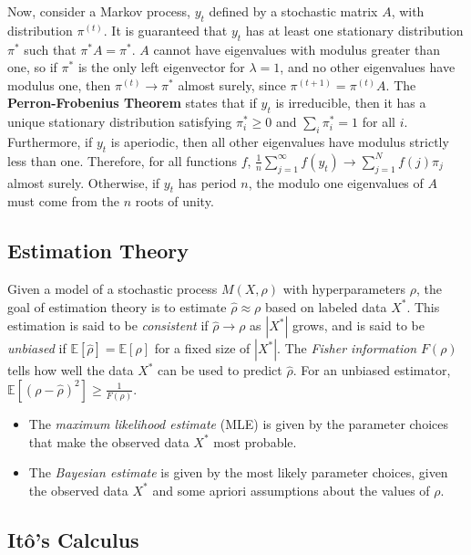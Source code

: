 \documentclass[12pt]{article}
\begin{document}
Now, consider a Markov process, $y_t$ defined by a stochastic matrix $A$,
with distribution $\pi^{(t)}$.
It is guaranteed that $y_t$ has at least one stationary distribution $\pi^*$
such that $\pi^* A = \pi^*$.
$A$ cannot have eigenvalues with modulus greater than one, so if $\pi^*$ is
the only left eigenvector for $\lambda=1$, and no other eigenvalues have modulus
one, then $\pi^{(t)}\rightarrow \pi^*$ almost surely, since
$\pi^{(t+1)} = \pi^{(t)}A$.
The {\bf Perron-Frobenius Theorem} states that if $y_t$ is irreducible,
then it has a unique stationary distribution satisfying $\pi^*_i \geq 0$
and $\sum_i \pi^*_i = 1$ for all $i$. 
Furthermore, if $y_t$ is aperiodic, then all other eigenvalues have
modulus strictly less than one.
Therefore, for all functions $f$,
$\frac{1}{n}\sum_{j=1}^\infty f(y_t) \rightarrow \sum_{j=1}^N f(j) \pi_j$
almost surely.
Otherwise, if $y_t$ has period $n$, the modulo one eigenvalues of $A$
must come from the $n$ roots of unity.

\subsection*{Estimation Theory}

Given a model of a stochastic process $M(X,\rho)$ with hyperparameters
$\rho$, the goal of estimation theory is to estimate 
${\hat \rho} \approx \rho$ based on labeled data $X^*$.
This estimation is said to be {\it consistent} if 
${\hat \rho} \rightarrow \rho$ as $|X^*|$ grows, and is said to be
{\it unbiased} if $\mathbb{E}[{\hat \rho}] = \mathbb{E}[\rho]$ for a
fixed size of $|X^*|$.
The {\it Fisher information} $F(\rho)$ tells how well the data $X^*$ can be
used to predict ${\hat \rho}$.
For an unbiased estimator,
$\mathbb{E}[(\rho - {\hat \rho})^2] \geq \frac{1}{F(\rho)}$.
\begin{itemize}
\item The {\it maximum likelihood estimate} (MLE) is given by the parameter
choices that make the observed data $X^*$ most probable.
\item The {\it Bayesian estimate} is given by the most likely parameter
choices, given the observed data $X^*$ and some apriori assumptions about
the values of $\rho$.
\end{itemize}

\subsection*{It\^{o}'s Calculus}
\end{document}
